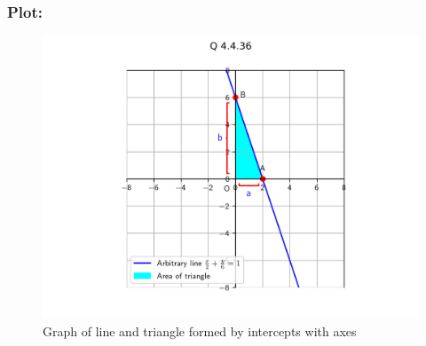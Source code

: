 \documentclass{beamer}
\begin{document}
\begin{frame}
    \frametitle{Plot: }
    \begin{figure}[h!]
        \centering
        \includegraphics[width=0.9\columnwidth]{../figs/plot.png}
        \caption{Graph of line and triangle formed by intercepts with axes}
        \label{fig:4.4.36}
    \end{figure}
\end{frame}
\end{document}
